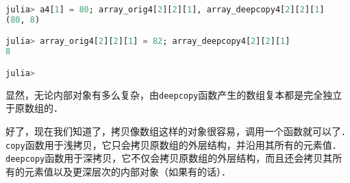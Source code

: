 \begin{lstlisting}[language=julia]
julia> a4[1] = 80; array_orig4[2][2][1], array_deepcopy4[2][2][1]
(80, 8)

julia> array_orig4[2][2][1] = 82; array_deepcopy4[2][2][1]
8

julia> 
\end{lstlisting}

显然，无论内部对象有多么复杂，由\verb|deepcopy|函数产生的数组复本都是完全独立于原数组的．

好了，现在我们知道了，拷贝像数组这样的对象很容易，调用一个函数就可以了．\verb|copy|函数用于浅拷贝，它只会拷贝原数组的外层结构，并沿用其所有的元素值．\verb|deepcopy|函数用于深拷贝，它不仅会拷贝原数组的外层结构，而且还会拷贝其所有的元素值以及更深层次的内部对象（如果有的话）．